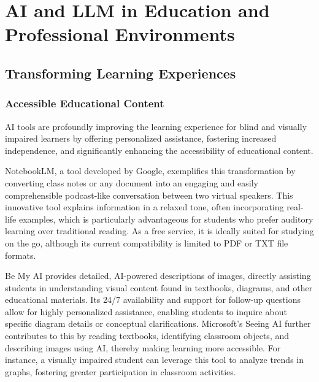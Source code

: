 \section{AI and LLM in Education and Professional Environments}

\subsection{Transforming Learning Experiences}

\subsubsection{Accessible Educational Content}

AI tools are profoundly improving the learning experience for blind and visually impaired learners by offering personalized assistance, fostering increased independence, and significantly enhancing the accessibility of educational content. \cite{victastudents2024}

NotebookLM, a tool developed by Google, exemplifies this transformation by converting class notes or any document into an engaging and easily comprehensible podcast-like conversation between two virtual speakers. This innovative tool explains information in a relaxed tone, often incorporating real-life examples, which is particularly advantageous for students who prefer auditory learning over traditional reading. As a free service, it is ideally suited for studying on the go, although its current compatibility is limited to PDF or TXT file formats. \cite{victastudents2024}

Be My AI provides detailed, AI-powered descriptions of images, directly assisting students in understanding visual content found in textbooks, diagrams, and other educational materials. Its 24/7 availability and support for follow-up questions allow for highly personalized assistance, enabling students to inquire about specific diagram details or conceptual clarifications. \cite{victastudents2024} Microsoft's Seeing AI further contributes to this by reading textbooks, identifying classroom objects, and describing images using AI, thereby making learning more accessible. For instance, a visually impaired student can leverage this tool to analyze trends in graphs, fostering greater participation in classroom activities. \cite{victastudents2024}

